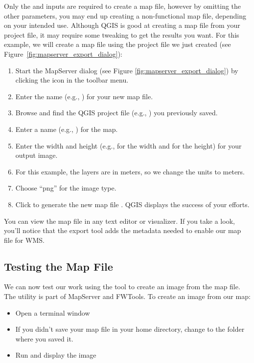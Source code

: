Only the  and  inputs are
required to create a map file, however by omitting the other parameters,
you may end up creating a non-functional map file, depending on your intended use.
Although QGIS is good at creating a map file from your project file,
it may require some tweaking to get the results you want.
For this example, we will create a map file using the project file
 we just created
(see Figure~\ref{fig:mapserver_export_dialog}):

\begin{enumerate}
  \item  Start the MapServer dialog (see
Figure \ref{fig:mapserver_export_dialog}) by clicking the  icon in the toolbar menu.
  \item Enter the name (e.g., ) for your new map file.
  \item Browse and find the QGIS project file (e.g., )
  you previously saved.
  \item Enter a name (e.g., ) for the map.
  \item Enter the width and height (e.g.,  for the width and  for the height) for your output image.
  \item For this example, the layers are in meters, so we change the units to meters.
  \item Choose ``png'' for the image type.
  \item Click  to generate the new map file .
  QGIS displays the success of your efforts.
\end{enumerate}

You can view the map file in any text editor or visualizer. If you
take a look, you'll notice that the export tool adds the metadata needed
to enable our map file for WMS.

\subsection{Testing the Map File}

We can now test our work using the  tool to create an image
from the map file. The  utility is part of MapServer and FWTools.
To create an image from our map:

\begin{itemize}[label=--]
\item Open a terminal window
\item If you didn't save your map file in your home directory, change to
  the folder where you saved it.
\item Run  and
  display the image
\end{itemize}

